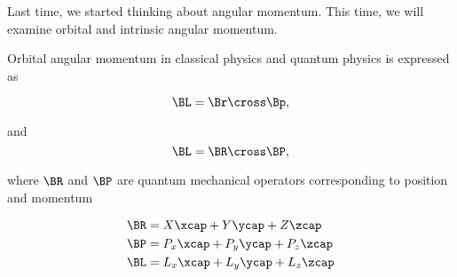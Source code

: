 %
%

Last time, we started thinking about angular momentum.  This time, we will examine orbital and intrinsic angular momentum.

Orbital angular momentum in classical physics and quantum physics is expressed as

\begin{equation}\label{eqn:PHY356Foct19:1000}
\BL = \Br \cross \Bp,
\end{equation}

and
\begin{equation}\label{eqn:PHY356Foct19:1001}
\BL = \BR \cross \BP,
\end{equation}

where \(\BR\) and \(\BP\) are quantum mechanical operators corresponding to position and momentum

\begin{equation}\label{eqn:PHY356Foct19:1002}
\begin{aligned}
\BR &= X \xcap + Y \ycap + Z \zcap \\
\BP &= P_x \xcap + P_y \ycap + P_z \zcap \\
\BL &= L_x \xcap + L_y \ycap + L_z \zcap
\end{aligned}
\end{equation}

